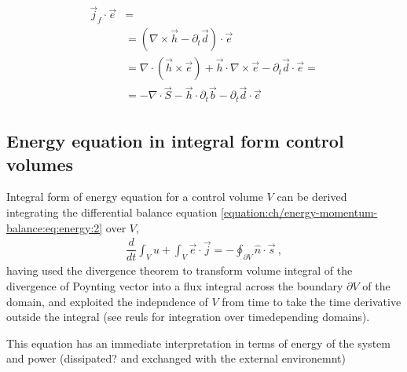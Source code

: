 \documentclass[letterpaper,10pt,english]{jupyterBook}
\begin{document}
\begin{equation}\label{equation:ch/energy-momentum-balance:eq:energy:free-current}
\begin{split}\begin{aligned}
  \vec{j}_f \cdot \vec{e} & = \\
  & = \left( \nabla \times \vec{h} - \partial_t \vec{d} \right) \cdot \vec{e} \\
  & = \nabla \cdot \left( \vec{h} \times \vec{e} \right) + \vec{h} \cdot \nabla \times \vec{e} - \partial_t \vec{d} \cdot \vec{e} =  \\
  & = - \nabla \cdot \vec{S} - \vec{h} \cdot \partial_t \vec{b} - \partial_t \vec{d} \cdot \vec{e} \ 
\end{aligned}\end{split}
\end{equation}

\subsection{Energy equation in integral form \sphinxhyphen{} control volumes}
\label{\detokenize{ch/energy-momentum-balance:energy-equation-in-integral-form-control-volumes}}\label{\detokenize{ch/energy-momentum-balance:classical-electromagnetism-energy-momentum-energy-integral-control}}
\sphinxAtStartPar
Integral form of energy equation for a control volume \(V\) can be derived integrating the differential balance equation \eqref{equation:ch/energy-momentum-balance:eq:energy:2} over \(V\),
\begin{equation}\label{equation:ch/energy-momentum-balance:eq:energy:integral:1}
\begin{split}\dfrac{d}{dt}\int_{V} u + \int_{V} \vec{e} \cdot \vec{j} = - \oint_{\partial V} \hat{n} \cdot \vec{s}  \ ,\end{split}
\end{equation}
\sphinxAtStartPar
having used the divergence theorem to transform volume integral of the divergence of Poynting vector into a flux integral across the boundary \(\partial V\) of the domain, and exploited the indepndence of \(V\) from time to take the time derivative outside the integral (see reuls for integration over time\sphinxhyphen{}depending domains).

\sphinxAtStartPar
{} This equation has an immediate interpretation in terms of energy of the system and power (dissipated? and exchanged with the external environemnt)  
\end{document}
